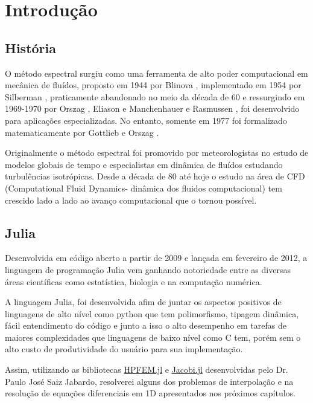 \chapter{Introdução}
\label{cap:introducao}
\section{História}
O método espectral surgiu como uma ferramenta de alto poder computacional em mecânica de fluídos, proposto em 1944 por Blinova \cite{blinova1944}, implementado em 1954 por Silberman \cite{silberman}, praticamente abandonado no meio da década de 60 e ressurgindo em 1969-1970 por Orszag \cite{Orszag70}, Eliason e Manchenhauer  e Rasmussen \cite{eliasenauermussen}, foi desenvolvido para aplicações especializadas. No entanto,  somente em 1977 foi formalizado matematicamente por Gottlieb e Orszag \cite{Orslieb77}.

Originalmente o método espectral foi promovido por meteorologistas no estudo de modelos globais de tempo e especialistas em dinâmica de fluídos estudando turbulências isotrópicas. Desde a década de 80 até hoje o  estudo na área de CFD (Computational Fluid Dynamics- dinâmica dos fluidos computacional) tem crescido lado a lado ao avanço computacional que o tornou possível.
\section{Julia}
Desenvolvida em código aberto a partir de 2009 e lançada em fevereiro de 2012, a linguagem de programação Julia vem ganhando notoriedade entre as diversas áreas científicas como estatística, biologia e na computação numérica.

A linguagem Julia, foi desenvolvida afim de juntar os aspectos positivos de linguagens de alto nível como python que tem polimorfismo, tipagem dinâmica, fácil entendimento do código e junto a isso o alto desempenho em tarefas de maiores complexidades que linguagens de baixo nível como C tem, porém sem o  alto custo de produtividade do usuário para sua implementação.

Assim, utilizando as bibliotecas \href{www.github.com/pjabardo/HPFEM.jl}{HPFEM.jl} e \href{www.github.com/pjabardo/Jacobi.jl}{Jacobi.jl} desenvolvidas pelo  Dr. Paulo José Saiz Jabardo, resolverei alguns dos problemas de interpolação e na resolução de equações diferenciais em 1D apresentados nos próximos capítulos.
%
%
%

